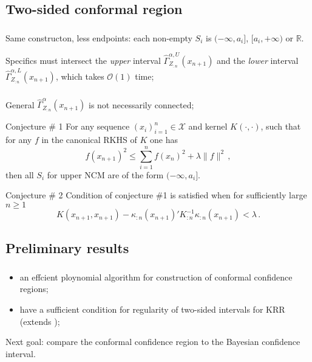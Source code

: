 \documentclass[t]{beamer}  %
\newcommand{\Xcal}{\mathcal{X}}
\newcommand{\Ocal}{\mathcal{O}}
\newcommand{\Real}{\mathbb{R}}
\begin{document}

\subsection{Two-sided conformal region} %
\label{sub:two_sided_conformal_region}

\begin{frame}[c]\frametitle{\insertsection}
  \framesubtitle{\insertsubsection}
  Same constructon, less endpoints: each non-empty $S_i$ is $(-\infty, a_i]$,
  $[a_i, +\infty)$ or $\Real$.

  \begin{block}{Specifics}
    must intersect the \textit{upper} interval $\hat{\Gamma}_{Z_{:n}}^{\alpha, U}(x_{n+1})$
    and the \textit{lower} interval $\hat{\Gamma}_{Z_{:n}}^{\alpha, L}(x_{n+1})$, which
    takes $\Ocal(1)$ time;
  \end{block}
\end{frame}

\begin{frame}[c]\frametitle{\insertsection}
  \framesubtitle{\insertsubsection}
  General $\hat{\Gamma}_{Z_{:n}}^\alpha(x_{n+1})$ is not necessarily connected;
  \begin{block}{Conjecture \# 1}
    For any sequence $(x_i)_{i=1}^n\in \Xcal$ and kernel $K(\cdot, \cdot)$, such
    that for any $f$ in the canonical RKHS of $K$ one has
    $$ f(x_{n+1})^2 \leq \sum_{i=1}^n f(x_n)^2 + \lambda \|f\|^2 \,, $$
    then all $S_i$ for upper NCM are of the form $(-\infty, a_i]$.
  \end{block}
  \begin{block}{Conjecture \# 2}
    Condition of conjecture \#1 is satisfied when for sufficiently large $n\geq 1$
    $$ K(x_{n+1}, x_{n+1}) - \kappa_{:n}(x_{n+1})' K^{-1}_{:n} \kappa_{:n}(x_{n+1})
      < \lambda \,. $$
  \end{block}
\end{frame}


\subsection{Preliminary results} %
\label{sub:preliminary_results}

\begin{frame}[c]\frametitle{\insertsection}
  \framesubtitle{\insertsubsection}
  \begin{itemize}
    \item an effcient ploynomial algorithm for construction of conformal
    confidence regions;
    \item have a sufficient condition for regularity of two-sided intervals
    for KRR (extends \cite{burnaevV14});
  \end{itemize}

  Next goal: compare the conformal confidence region to the Bayesian confidence
  interval.
\end{frame}
\end{document}
